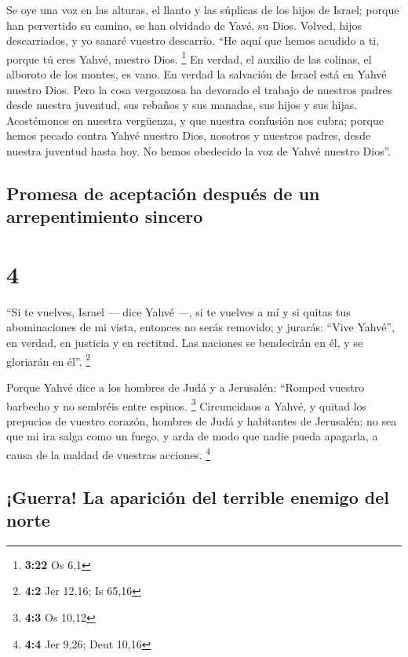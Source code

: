  Se oye una voz en las alturas, el llanto y las súplicas
de los hijos de Israel; porque han pervertido su camino, se han olvidado
de Yavé, su Dios.  Volved, hijos descarriados, y yo
sanaré vuestro descarrío. ``He aquí que hemos acudido a ti, porque tú
eres Yahvé, nuestro Dios. \footnote{\textbf{3:22} Os 6,1}
 En verdad, el auxilio de las colinas, el alboroto de los
montes, es vano. En verdad la salvación de Israel está en Yahvé nuestro
Dios.  Pero la cosa vergonzosa ha devorado el trabajo de
nuestros padres desde nuestra juventud, sus rebaños y sus manadas, sus
hijos y sus hijas.  Acostémonos en nuestra vergüenza, y
que nuestra confusión nos cubra; porque hemos pecado contra Yahvé
nuestro Dios, nosotros y nuestros padres, desde nuestra juventud hasta
hoy. No hemos obedecido la voz de Yahvé nuestro Dios''.

\hypertarget{promesa-de-aceptaciuxf3n-despuuxe9s-de-un-arrepentimiento-sincero}{%
\subsection{Promesa de aceptación después de un arrepentimiento
sincero}\label{promesa-de-aceptaciuxf3n-despuuxe9s-de-un-arrepentimiento-sincero}}

\hypertarget{section-3}{%
\section{4}\label{section-3}}

 ``Si te vuelves, Israel --- dice Yahvé ---, si te vuelves
a mí y si quitas tus abominaciones de mi vista, entonces no serás
removido;  y jurarás: ``Vive Yahvé'', en verdad, en
justicia y en rectitud. Las naciones se bendecirán en él, y se gloriarán
en él''. \footnote{\textbf{4:2} Jer 12,16; Is 65,16}

 Porque Yahvé dice a los hombres de Judá y a Jerusalén:
``Romped vuestro barbecho y no sembréis entre espinos. \footnote{\textbf{4:3}
  Os 10,12}  Circuncidaos a Yahvé, y quitad los prepucios
de vuestro corazón, hombres de Judá y habitantes de Jerusalén; no sea
que mi ira salga como un fuego, y arda de modo que nadie pueda apagarla,
a causa de la maldad de vuestras acciones. \footnote{\textbf{4:4} Jer
  9,26; Deut 10,16}

\hypertarget{guerra-la-apariciuxf3n-del-terrible-enemigo-del-norte}{%
\subsection{¡Guerra! La aparición del terrible enemigo del
norte}\label{guerra-la-apariciuxf3n-del-terrible-enemigo-del-norte}}

